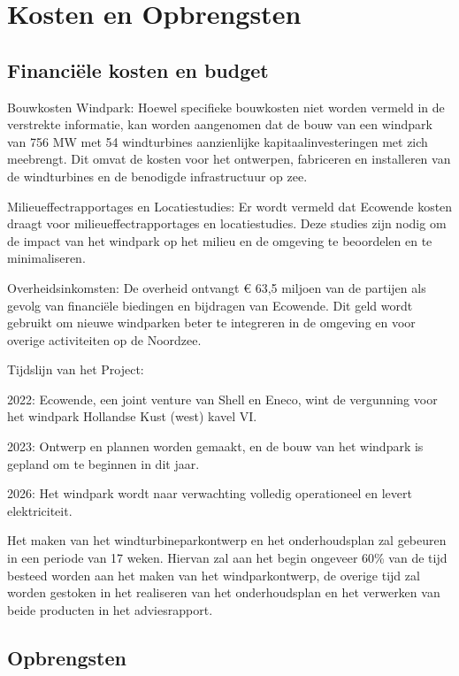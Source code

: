 \section{Kosten en Opbrengsten}
    \subsection{Financiële kosten en budget}
    Bouwkosten Windpark: Hoewel specifieke bouwkosten niet worden vermeld in de verstrekte informatie, kan worden aangenomen dat de bouw van een windpark van 756 MW met 54 windturbines aanzienlijke kapitaalinvesteringen met zich meebrengt. Dit omvat de kosten voor het ontwerpen, fabriceren en installeren van de windturbines en de benodigde infrastructuur op zee.

    Milieueffectrapportages en Locatiestudies: Er wordt vermeld dat Ecowende kosten draagt voor milieueffectrapportages en locatiestudies. Deze studies zijn nodig om de impact van het windpark op het milieu en de omgeving te beoordelen en te minimaliseren.

    Overheidsinkomsten: De overheid ontvangt € 63,5 miljoen van de partijen als gevolg van financiële biedingen en bijdragen van Ecowende. Dit geld wordt gebruikt om nieuwe windparken beter te integreren in de omgeving en voor overige activiteiten op de Noordzee.

Tijdslijn van het Project:

    2022: Ecowende, een \gls{joint venture} van Shell en Eneco, wint de vergunning voor het windpark Hollandse Kust (west) kavel VI.

    2023: Ontwerp en plannen worden gemaakt, en de bouw van het windpark is gepland om te beginnen in dit jaar.

    2026: Het windpark wordt naar verwachting volledig operationeel en levert elektriciteit.

Het maken van het windturbineparkontwerp en het onderhoudsplan zal gebeuren in een periode van 17 weken. Hiervan zal aan het begin ongeveer 60\% van de tijd besteed worden aan het maken van het windparkontwerp, de overige tijd zal worden gestoken in het realiseren van het onderhoudsplan en het verwerken van beide producten in het adviesrapport.\cite{studiewijzer} 

\subsection{Opbrengsten}

